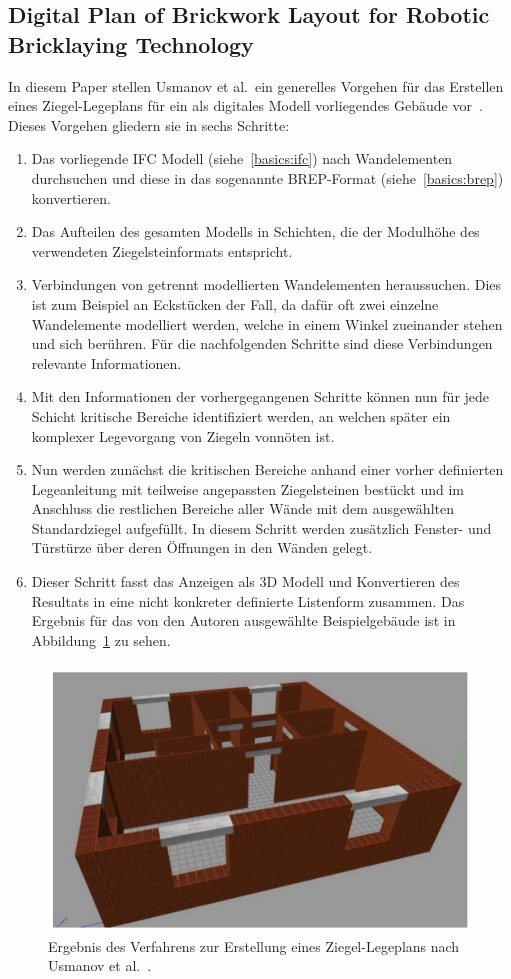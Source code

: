 \subsection{Digital Plan of Brickwork Layout for Robotic Bricklaying Technology}\label{related:digital_plan_of_brickwork_layout}
In diesem Paper stellen Usmanov et al.\ ein generelles Vorgehen für das Erstellen eines Ziegel-Legeplans für ein als digitales Modell vorliegendes Gebäude vor~\cite{Usmanov2021}.
Dieses Vorgehen gliedern sie in sechs Schritte:
\begin{enumerate}
\item Das vorliegende IFC Modell (siehe~\ref{basics:ifc}) nach Wandelementen durchsuchen und diese in das sogenannte BREP-Format (siehe~\ref{basics:brep}) konvertieren.
\item Das Aufteilen des gesamten Modells in Schichten, die der Modulhöhe des verwendeten Ziegelsteinformats entspricht.
\item Verbindungen von getrennt modellierten Wandelementen heraussuchen. 
Dies ist zum Beispiel an Eckstücken der Fall, da dafür oft zwei einzelne Wandelemente modelliert werden, welche in einem Winkel zueinander stehen und sich berühren. 
Für die nachfolgenden Schritte sind diese Verbindungen relevante Informationen.
\item Mit den Informationen der vorhergegangenen Schritte können nun für jede Schicht kritische Bereiche identifiziert werden, an welchen später ein komplexer Legevorgang von Ziegeln vonnöten ist.
\item Nun werden zunächst die kritischen Bereiche anhand einer vorher definierten Legeanleitung mit teilweise angepassten Ziegelsteinen bestückt und im Anschluss die restlichen Bereiche aller Wände mit dem ausgewählten Standardziegel aufgefüllt. 
In diesem Schritt werden zusätzlich Fenster- und Türstürze über deren Öffnungen in den Wänden gelegt.
\item Dieser Schritt fasst das Anzeigen als 3D Modell und Konvertieren des Resultats in eine nicht konkreter definierte Listenform zusammen. 
Das Ergebnis für das von den Autoren ausgewählte Beispielgebäude ist in Abbildung~\ref{fig:related:usmanov} zu sehen. 
\end{enumerate}

\begin{figure}[h!]
    \centering
    \includegraphics[width=0.7\columnwidth]{fig/sustainability1303905g004.png}
    \caption{Ergebnis des Verfahrens zur Erstellung eines Ziegel-Legeplans nach Usmanov et al.~\cite{Usmanov2021}.}\label{fig:related:usmanov}
\end{figure}

